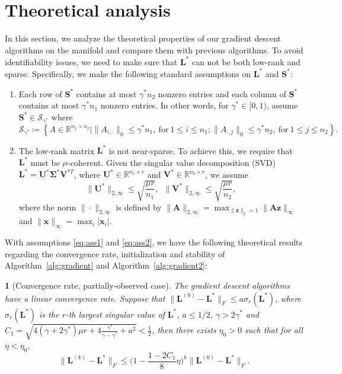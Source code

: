 \documentclass[12pt]{article}
\newcommand{\bx}{\boldsymbol{x}}
\newcommand{\bz}{\boldsymbol{z}}
\newcommand{\bL}{\boldsymbol{L}}
\newcommand{\bSigma}{\boldsymbol\Sigma}
\newcommand{\bU}{\boldsymbol{U}}
\newcommand{\bV}{\boldsymbol{V}}
\def\reals{\mathbb{R}}
\def\bx{\boldsymbol{x}}
\def\bS{\boldsymbol{S}}
\def\bSigma{\boldsymbol\Sigma}
\def\bU{\boldsymbol{U}}
\def\bA{\boldsymbol{A}}
\theoremstyle{plain}
\theoremstyle{definition}
\theoremstyle{plain}
\newtheorem{thm}{\protect\theoremname}
\theoremstyle{plain}
\theoremstyle{remark}
\providecommand{\theoremname}{Theorem}
\begin{document}
\section{Theoretical analysis}\label{sec:theory}
In this section, we analyze the theoretical properties of our gradient descent algorithms on the manifold and compare them with previous algorithms. To avoid identifiability issues,  we need to make sure that $\bL^{*}$ can not be both low-rank and sparse. Specifically, we make the following standard assumptions on $\bL^{*}$ and $\bS^{*}$:
\begin{enumerate}
\item  Each row of $\bS^*$ contains at most $\gamma^*n_2$ nonzero entries and each column of $\bS^*$ contains at most $\gamma^*n_1$ nonzero entries. In other words, for $\gamma^{*}\in[0,1)$, assume $\bS^*\in \mathcal{S}_{\gamma^{*}}$ where
\begin{equation}\label{eq:ass1}
\mathcal{S_{\gamma^{*}}\coloneqq}\left\{ A\in\mathbb{R}^{n_{1}\times n_{2}}\mid\|A_{i,\cdot}\|_{0}\leq\gamma^{*} n_{1},\ \mathrm{for}\ 1\leq i\leq n_{1};\|A_{\cdot,j}\|_{0}\leq\gamma^{*} n_{2},\ \mathrm{for}\ 1\leq j\leq n_{2}\right\}. 
\end{equation}
\item The low-rank matrix $\bL^{*}$ is not near-sparse. To achieve this, we require that  $\bL^{*}$ must be $\mu$-coherent. Given the singular value decomposition (SVD)  $\bL^{*}=\bU^{*}\bSigma^{*}\bV^{*T}$, where $\bU^{*}\in\reals^{n_1\times r}$ and  $\bV^{*}\in\reals^{n_2\times r}$, we assume
\begin{equation}\label{eq:ass2}
\|\bU^{*}\|_{2,\infty}\leq \sqrt{\frac{\mu r}{n_1}}, \,\,\,\|\bV^{*}\|_{2,\infty}\leq \sqrt{\frac{\mu r}{n_2}},
\end{equation}
where the norm $\|\cdot\|_{2,\infty}$ is defined by  $\|\bA\|_{2,\infty}=\max_{\|\bz\|_2=1}\|\bA\bz\|_\infty$ and $\|\bx\|_\infty=\max_{i}|\bx_i|$.
\end{enumerate}


With assumptions \eqref{eq:ass1} and \eqref{eq:ass2}, we have the following theoretical results regarding the convergence rate, initialization and stability of Algorithm~\ref{alg:gradient} and Algorithm~\ref{alg:gradient2}:
\begin{thm}[Convergence rate, partially-observed case]\label{thm:main}
The gradient descent algorithms have a linear convergence rate. Suppose that $\|\bL^{(0)}-\bL^*\|_F\leq a\sigma_r(\bL^*)$, where $\sigma_r(\bL^*)$ is the $r$-th largest singular value of $\bL^*$, $a\leq 1/2$, $\gamma>2\gamma^*$ and  $C_1=\sqrt{4(\gamma+2\gamma^*)\mu r+ 4\frac{\gamma^*}{\gamma-\gamma^*} +a^2}<\frac{1}{2}$, then there exists $\eta_0>0$ such that for all $\eta<\eta_0$,
\[
\|\bL^{(k)}-\bL^*\|_F\leq \Big(1-\frac{1-2C_1}{8}\eta\Big)^k \|\bL^{(0)}-\bL^*\|_F.
\]
\end{thm}
\end{document}
